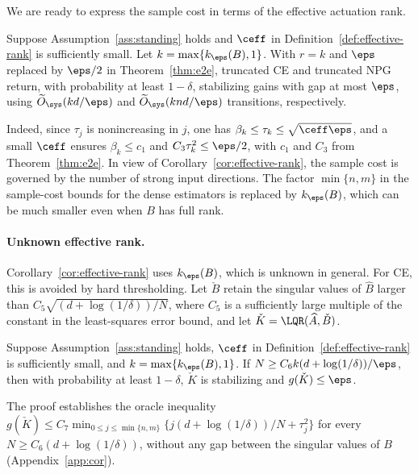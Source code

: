 We are ready to express the sample cost in terms of the effective
actuation rank.

\begin{corollary}\label{cor:effective-rank}
Suppose Assumption~\ref{ass:standing} holds and $\ceff$ in Definition~\ref{def:effective-rank} is sufficiently small.
Let $k=\max\{k_\eps(B),1\}$. With $r=k$ and $\eps$ replaced by $\eps/2$
in Theorem~\ref{thm:e2e}, truncated CE and truncated NPG return, with
probability at least $1-\delta$, stabilizing gains with gap at most
$\eps$, using $\widetilde O_{\sys}(kd/\eps)$ and
$\widetilde O_{\sys}(knd/\eps)$ transitions, respectively.
\end{corollary}

Indeed, since $\tau_j$ is nonincreasing in $j$, one has
$\beta_k\le\tau_k\le\sqrt{\ceff\eps}$, and a small $\ceff$ ensures
$\beta_k\le c_1$ and $C_3\tau_k^2\le\eps/2$, with $c_1$ and $C_3$ from
Theorem~\ref{thm:e2e}. In view of
Corollary~\ref{cor:effective-rank}, the sample cost is governed by the
number of strong input directions. The factor $\min\{n,m\}$ in the
sample-cost bounds for the dense estimators is replaced by $k_\eps(B)$,
which can be much smaller even when $B$ has full rank.

\paragraph{Unknown effective rank.}
Corollary~\ref{cor:effective-rank} uses $k_\eps(B)$, which is unknown in
general. For CE, this is avoided by hard thresholding. Let $\check B$
retain the singular values of $\widehat B$ larger than
$C_5\sqrt{(d+\log(1/\delta))/N}$, where $C_5$ is a sufficiently large
multiple of the constant in the least-squares error bound, and let
$\check K=\LQR(\widehat A,\check B)$.

\begin{corollary}\label{cor:adaptive-rate}
Suppose Assumption~\ref{ass:standing} holds, $\ceff$ in
Definition~\ref{def:effective-rank} is sufficiently small, and
$k=\max\{k_\eps(B),1\}$. If
$N\ge C_6k(d+\log(1/\delta))/\eps$, then with probability at least
$1-\delta$, $\check K$ is stabilizing and $g(\check K)\le\eps$.
\end{corollary}

The proof establishes the oracle inequality
$g(\check K)\le C_7\min_{0\le j\le\min\{n,m\}}\{j(d+\log(1/\delta))/N+\tau_j^2\}$
for every $N\ge C_6(d+\log(1/\delta))$, without any gap between the
singular values of $B$ (Appendix~\ref{app:cor}).


